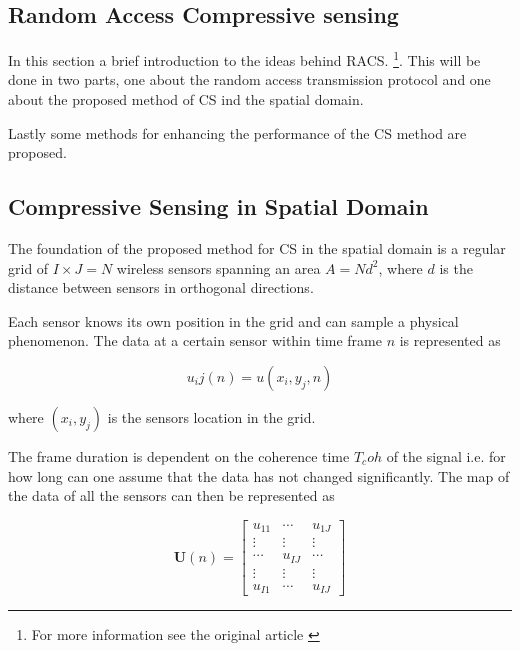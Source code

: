 \documentclass[Main]{subfiles}
\begin{document}
	





	\subsection{Random Access Compressive sensing} %
	\label{sub:random_access_compressive_sensing}

		In this section a brief introduction to the ideas behind RACS.
		\footnote{For more information see the original article \cite{Fazel2011}}.
		This will be done in two parts, one about the random access transmission protocol and one about the proposed method of CS ind the spatial domain.

		Lastly some methods for enhancing the performance of the CS method are proposed.
		
		\subsection{Compressive Sensing in Spatial Domain} %
		\label{sub:compressive_sensing_in_spatial_domain}

			The foundation of the proposed method for CS in the spatial domain is a regular grid of $I \times J = N$ wireless sensors spanning an area $A = Nd^2$, where $d$ is the distance between sensors in orthogonal directions.

			Each sensor knows its own position in the grid and can sample a physical phenomenon.
			The data at a certain sensor within time frame $n$ is represented as

			\begin{equation}
				u_ij(n) = u(x_i, y_j, n)
			\end{equation}

			where $(x_i, y_j)$ is the sensors location in the grid.

			The frame duration is dependent on the coherence time $T_coh$ of the signal i.e. for how long can one assume that the data has not changed significantly.
			The map of the data of all the sensors can then be represented as

			\begin{equation}
				\mathbf{U}(n) =
			 	\begin{bmatrix}
			  		u_{11}	&	\cdots 	& 	u_{1J}	\\
			  		\vdots	&	\vdots	&	\vdots	\\
					\cdots 	& 	u_{IJ}	& 	\cdots 	\\
					\vdots	&	\vdots	&	\vdots	\\
					u_{I1} 	& 	\cdots 	& 	u_{IJ}
				\end{bmatrix}
			\end{equation}
\end{document}
